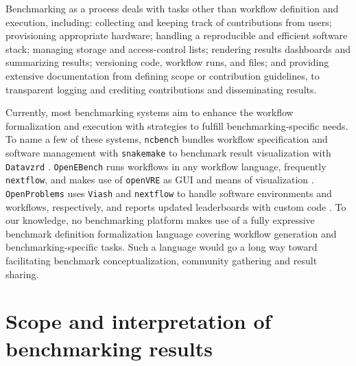 \documentclass[11pt]{article}
\begin{document}
Benchmarking as a process deals with tasks other than workflow definition and execution, including: collecting and keeping track of contributions from users; provisioning appropriate hardware; handling a reproducible and efficient software stack; managing storage and access-control lists; rendering results dashboards and summarizing results; versioning code, workflow runs, and files; and providing extensive documentation from defining scope or contribution guidelines, to transparent logging and crediting contributions and disseminating results.

Currently, most benchmarking systems aim to enhance the workflow formalization and execution with strategies to fulfill benchmarking-specific needs. To name a few of these systems, \texttt{ncbench} bundles workflow specification and software management with \texttt{snakemake} to benchmark result visualization with \texttt{Datavzrd} \cite{Hanssen2023-uf}. \texttt{OpenEBench} runs workflows in any workflow language, frequently \texttt{nextflow}, and makes use of \texttt{openVRE} as GUI and means of visualization \cite{Capella-Gutierrez2017-dh}. \texttt{OpenProblems} uses \texttt{Viash} and \texttt{nextflow} to handle software environments and workflows, respectively, and reports updated leaderboards with custom code \cite{Luecken2024-fk}. To our knowledge, no benchmarking platform makes use of a fully expressive benchmark definition formalization language covering workflow generation and benchmarking-specific tasks. Such a language would go a long way toward facilitating benchmark conceptualization, community gathering and result sharing.

\section*{Scope and interpretation of benchmarking results}
\end{document}
